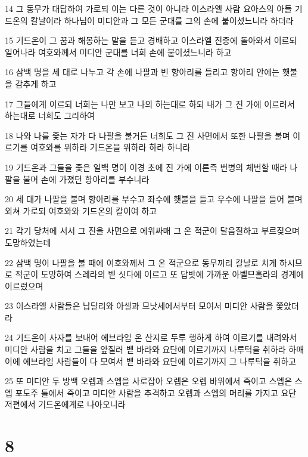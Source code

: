 \par 14 그 동무가 대답하여 가로되 이는 다른 것이 아니라 이스라엘 사람 요아스의 아들 기드온의 칼날이라 하나님이 미디안과 그 모든 군대를 그의 손에 붙이셨느니라 하더라
\par 15 기드온이 그 꿈과 해몽하는 말을 듣고 경배하고 이스라엘 진중에 돌아와서 이르되 일어나라 여호와께서 미디안 군대를 너희 손에 붙이셨느니라 하고
\par 16 삼백 명을 세 대로 나누고 각 손에 나팔과 빈 항아리를 들리고 항아리 안에는 횃불을 감추게 하고
\par 17 그들에게 이르되 너희는 나만 보고 나의 하는대로 하되 내가 그 진 가에 이르러서 하는대로 너희도 그리하여
\par 18 나와 나를 좇는 자가 다 나팔을 불거든 너희도 그 진 사면에서 또한 나팔을 불며 이르기를 여호와를 위하라 기드온을 위하라 하라 하니라
\par 19 기드온과 그들을 좇은 일백 명이 이경 초에 진 가에 이른즉 번병의 체번할 때라 나팔을 불며 손에 가졌던 항아리를 부수니라
\par 20 세 대가 나팔을 불며 항아리를 부수고 좌수에 횃불을 들고 우수에 나팔을 들어 불며 외쳐 가로되 여호와와 기드온의 칼이여 하고
\par 21 각기 당처에 서서 그 진을 사면으로 에워싸매 그 온 적군이 달음질하고 부르짖으며 도망하였는데
\par 22 삼백 명이 나팔을 불 때에 여호와께서 그 온 적군으로 동무끼리 칼날로 치게 하시므로 적군이 도망하여 스레라의 벧 싯다에 이르고 또 답밧에 가까운 아벨므홀라의 경계에 이르렀으며
\par 23 이스라엘 사람들은 납달리와 아셀과 므낫세에서부터 모여서 미디안 사람을 쫓았더라
\par 24 기드온이 사자를 보내어 에브라임 온 산지로 두루 행하게 하여 이르기를 내려와서 미디안 사람을 치고 그들을 앞질러 벧 바라와 요단에 이르기까지 나루턱을 취하라 하매 이에 에브라임 사람들이 다 모여서 벧 바라와 요단에 이르기까지 그 나루턱을 취하고
\par 25 또 미디안 두 방백 오렙과 스엡을 사로잡아 오렙은 오렙 바위에서 죽이고 스엡은 스엡 포도주 틀에서 죽이고 미디안 사람을 추격하고 오렙과 스엡의 머리를 가지고 요단 저편에서 기드온에게로 나아오니라

\chapter{8}

